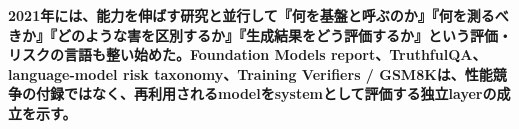 \noindent\textbf{2021年には、能力を伸ばす研究と並行して『何を基盤と呼ぶのか』『何を測るべきか』『どのような害を区別するか』『生成結果をどう評価するか』という評価・リスクの言語も整い始めた。Foundation Models report、TruthfulQA、language-model risk taxonomy、Training Verifiers / GSM8Kは、性能競争の付録ではなく、再利用されるmodelをsystemとして評価する独立layerの成立を示す。}\autocite{src-20fd9bba2e7a,src-34f845c1e710,src-750bc3eeb1bc,src-8536f9ceae6d,src-c16f4ae139bf,src-d9549fe4ff37}
